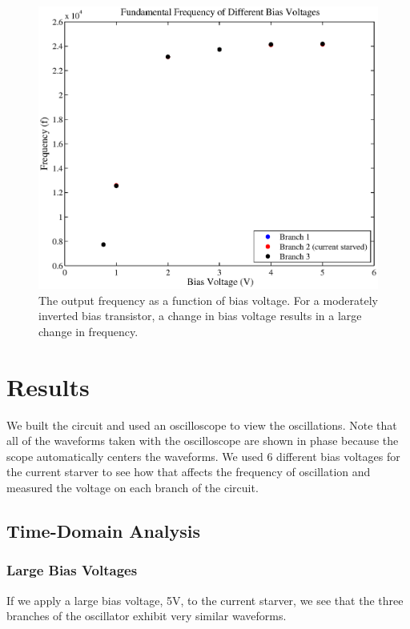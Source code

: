 \documentclass{article}
\begin{document}
\begin{figure}[H]
\centering
\includegraphics[scale=.7]{biasFrequenciesSim.eps}
\caption{The output frequency as a function of bias voltage. For a moderately inverted bias transistor, a change in bias voltage results in a large change in frequency.}
\label{biasFrequenciesSim}
\end{figure}

\section*{Results}

We built the circuit and used an oscilloscope to view the oscillations. Note that all of the waveforms taken with the oscilloscope are shown in phase because the scope automatically centers the waveforms. We used 6 different bias voltages for the current starver to see how that affects the frequency of oscillation and measured the voltage on each branch of the circuit.

\subsection*{Time-Domain Analysis}

\subsubsection*{Large Bias Voltages}

If we apply a large bias voltage, 5V, to the current starver, we see that the three branches of the oscillator exhibit very similar waveforms.
\end{document}
